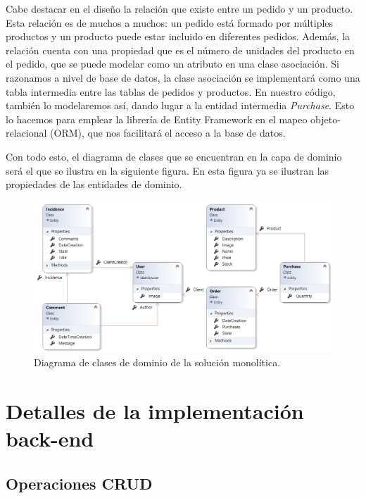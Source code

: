 \documentclass[11pt,spanish,listoffigures]{tfgetsinf}
\begin{document}
Cabe destacar en el diseño la relación que existe entre un pedido y un producto. Esta relación es de muchos a muchos: un pedido está formado por múltiples productos y un producto puede estar incluido en diferentes pedidos. Además, la relación cuenta con una propiedad que es el número de unidades del producto en el pedido, que se puede modelar como un atributo en una clase asociación. Si razonamos a nivel de base de datos, la clase asociación se implementará como una tabla intermedia entre las tablas de pedidos y productos. En nuestro código, también lo modelaremos así, dando lugar a la entidad intermedia \textit{Purchase}. Esto lo hacemos para emplear la librería de Entity Framework en el mapeo objeto-relacional (ORM), que nos facilitará el acceso a la base de datos.

Con todo esto, el diagrama de clases que se encuentran en la capa de dominio será el que se ilustra en la siguiente figura. En esta figura ya se ilustran las propiedades de las entidades de dominio.

\begin{figure}[h]
\centering
\includegraphics[scale=0.65]{ClassDiagram}
\caption{Diagrama de clases de dominio de la solución monolítica.}
\end{figure}

\newpage

\section{Detalles de la implementación back-end}

\subsection{Operaciones CRUD} \label{subsect:CRUD}
\end{document}
